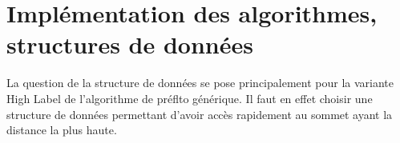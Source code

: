 \section{Implémentation des algorithmes, structures de données}

La question de la structure de données se pose principalement pour la variante High Label de
l'algorithme de préflto générique. Il faut en effet choisir une structure de données permettant
d'avoir accès rapidement au sommet ayant la distance la plus haute.
